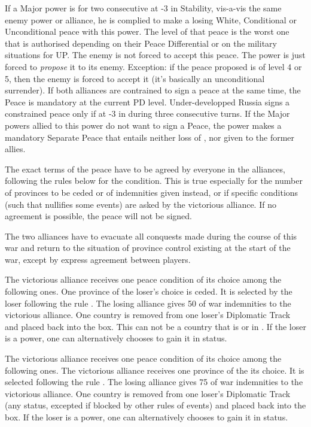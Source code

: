  If a Major power is for two consecutive at -3 in
Stability, vis-a-vis the same enemy power or alliance, he is complied to make
a losing White, Conditional or Unconditional peace with this power. The level
of that peace is the worst one that is authorised depending on their Peace
Differential or on the military situations for UP.
\bparag The enemy is not forced to accept this peace. The power is just forced
to \emph{propose} it to its enemy. Exception: if the peace proposed is of
level 4 or 5, then the enemy is forced to accept it (it's basically an
unconditional surrender).
\bparag If both alliances are contrained to sign a peace at the same time, the
Peace is mandatory at the current PD level.
\bparag Under-developped Russia signs a constrained peace only if at -3 in
\STAB during three consecutive turns.
\bparag If the Major powers allied to this power do not want to sign a Peace,
the power makes a mandatory Separate Peace that entails neither loss of \STAB,
nor \CB given to the former allies.

The exact terms of the peace have to be agreed by everyone in the alliances,
following the rules below for the condition. This is true especially for the
number of provinces to be ceded or of indemnities given instead, or if
specific conditions (such that nullifies some events) are asked by the
victorious alliance. If no agreement is possible, the peace will not be
signed.

The two alliances have to evacuate all conquests made during the course of
this war and return to the situation of province control existing at the start
of the war, except by express agreement between players.

\bparag The victorious alliance receives one peace condition of its choice
among the following ones.
 One province of the loser's choice is ceded.  It
is selected by the loser following the rule .
\bparag[Indemnities]
The losing alliance gives 50 \ducats of war indemnities to the victorious
alliance.
One country is removed from one loser's Diplomatic Track and placed back into
the \Neutral box. This can not be a country that is \VASSAL or in \ANNEXION.
If the loser is a \MIN power, one can alternatively chooses to gain it in \MR
status.

\bparag The victorious alliance receives one peace condition of its choice
among the following ones.
 The victorious alliance receives one province of
the its choice. It is selected following the rule .
\bparag[Indemnities]
The losing alliance gives 75 \ducats of war indemnities to the victorious
alliance.
One country is removed from one loser's Diplomatic Track (any status, excepted
if blocked by other rules of events) and placed back into the \Neutral box.
If the loser is a \MIN power, one can alternatively chooses to gain it in \MR
status.

